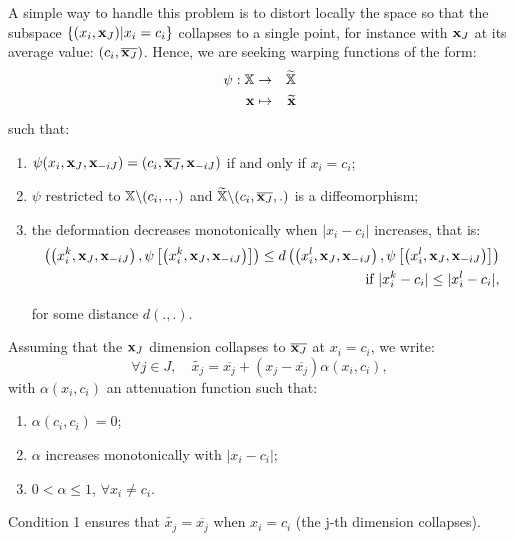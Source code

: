A simple way to handle this problem is to distort locally the space so that the subspace $\{(x_i, \mathbf{x}_J) | x_i = c_i\}$ collapses to a single point,
for instance with $\mathbf{x}_J$ at its average value: $(c_i, \overline{\mathbf{x}_J})$.
Hence, we are seeking warping functions of the form: 
\begin{eqnarray*}
 \psi: \mathbb{X} &\rightarrow& \widetilde{\mathbb{X}} \\
 \mathbf{x} & \mapsto &  \widetilde{\mathbf{x}}
\end{eqnarray*}
such that:
\begin{enumerate}
 \item $\psi(x_i, \mathbf{x}_J, \mathbf{x}_{-iJ}) = (c_i, \overline{\mathbf{x}_J}, \mathbf{x}_{-iJ})$ if and only if $x_i=c_i$;%
 \item $\psi$ restricted to $\mathbb{X} \backslash (c_i,.,.)$ and $\widetilde{\mathbb{X}} \backslash (c_i,\overline{\mathbf{x}_J},.)$ is a diffeomorphism;
 \item the deformation decreases monotonically when $\lvert x_i - c_i\rvert$ increases, that is: 
 \begin{eqnarray*}
  \left( \left(x_i^{k}, \mathbf{x}_J, \mathbf{x}_{-iJ} \right), \psi\left[\left(x_i^{k}, \mathbf{x}_J, \mathbf{x}_{-iJ}\right)\right] \right)\leq d \left( \left(x_i^{l}, \mathbf{x}_J, \mathbf{x}_{-iJ} \right), 
 \psi\left[\left(x_i^{l}, \mathbf{x}_J, \mathbf{x}_{-iJ}\right)\right]\right)  \\ \text{ if }\lvert x_i^{k}- c_i\rvert \leq \lvert x_i^{l}- c_i\rvert, 
 \end{eqnarray*}

for some distance $d(.,.)$.
\end{enumerate}

Assuming that the $\mathbf{x}_J$ dimension collapses to $\overline{\mathbf{x}_J}$ at $x_i=c_i$, we write:
\begin{equation}
 \forall j \in J, \quad \widetilde{x_j} = \overline{x_j} + \left( x_j - \overline{x_j}\right)\alpha(x_i, c_i),
\end{equation}
with $\alpha(x_i, c_i)$ an attenuation function such that:
\begin{enumerate}
 \item $\alpha(c_i, c_i) = 0$;
 \item $\alpha$ increases monotonically with $\lvert x_i - c_i\rvert$;
 \item $0 < \alpha \leq 1$, $\forall x_i \neq c_i$.
\end{enumerate}
Condition 1 ensures that $\widetilde{x_j} = \overline{x_j}$ when $x_i=c_i$ (the j-th dimension collapses).

